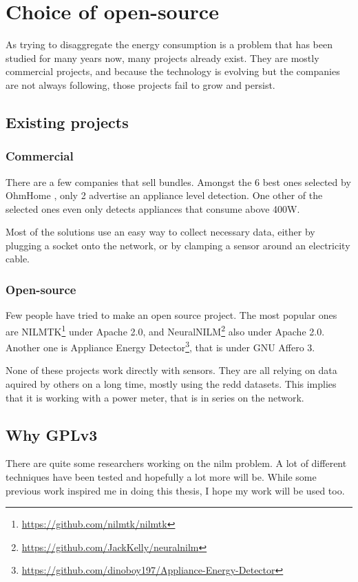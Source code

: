 \chapter{Choice of open-source}\label{section:open-source}
As trying to disaggregate the energy consumption is a problem that has been studied for many years now, many projects already exist. They are mostly commercial projects, and because the technology is evolving but the companies are not always following, those projects fail to grow and persist.

\section{Existing projects}
\subsection{Commercial}
There are a few companies that sell bundles. Amongst the 6 best ones selected by OhmHome \cite{opensourcelist}, only 2 advertise an appliance level detection. One other of the selected ones even only detects appliances that consume above 400W.

Most of the solutions use an easy way to collect necessary data, either by plugging a socket onto the network, or by clamping a sensor around an electricity cable.
\subsection{Open-source}
Few people have tried to make an open source project. The most popular ones are NILMTK\footnote{\url{https://github.com/nilmtk/nilmtk}}\cite{batra2014nilmtk} under Apache 2.0, and NeuralNILM\footnote{\url{https://github.com/JackKelly/neuralnilm}}\cite{kelly2015neural} also under Apache 2.0. Another one is Appliance Energy Detector\footnote{\url{https://github.com/dinoboy197/Appliance-Energy-Detector}}, that is under GNU Affero 3.

None of these projects work directly with sensors. They are all relying on data aquired by others on a long time, mostly using the \acrshort{redd} datasets. This implies that it is working with a power meter, that is in series on the network.
\section{Why GPLv3}
There are quite some researchers working on the \acrshort{nilm} problem. A lot of different techniques have been tested and hopefully a lot more will be. While some previous work inspired me in doing this thesis, I hope my work will be used too.

